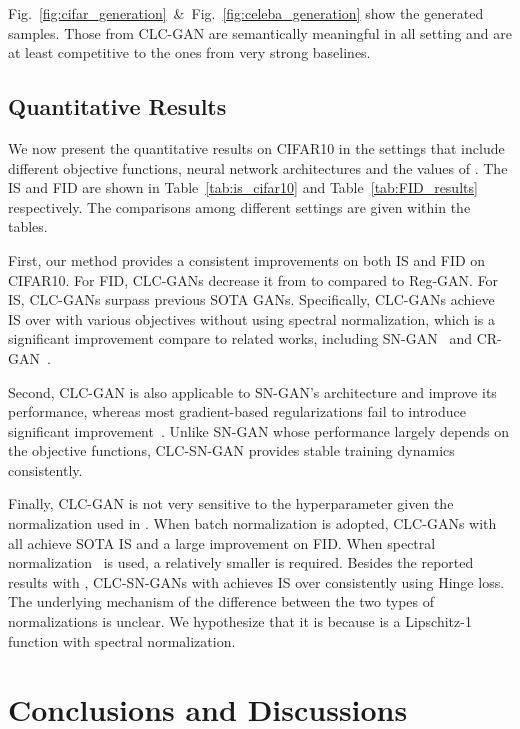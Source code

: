 \documentclass{article}
\newcommand{\fig}[1]{Fig.~\ref{fig:#1}}
\newcommand{\tabl}[1]{Table~\ref{tab:#1}}
\theoremstyle{definition}
\begin{document}
\fig{cifar_generation}~\&~\fig {celeba_generation} show the generated samples. Those from CLC-GAN are semantically meaningful in all setting and are at least competitive to the ones from very strong baselines.






\subsection{Quantitative Results}
\label{sec:quantative_results}

We now present the quantitative results on CIFAR10 in the settings that include different objective functions, neural network architectures and the values of . The IS and FID are shown in \tabl{is_cifar10} and \tabl{FID_results} respectively. The comparisons among different settings are given within the tables.



First, our method provides a consistent improvements on both IS and FID on CIFAR10. For FID, CLC-GANs decrease it from  to  compared to Reg-GAN. 
For IS, CLC-GANs surpass previous SOTA GANs. Specifically, CLC-GANs achieve IS over  with various objectives without using spectral normalization, which is a significant improvement compare to related works, including SN-GAN~\cite{miyato2018spectral} and CR-GAN~\cite{zhang2019consistency}. 

Second, CLC-GAN is also applicable to SN-GAN's architecture and improve its performance, whereas most gradient-based regularizations fail to introduce significant improvement~\cite{kurach2018large}.
Unlike SN-GAN whose performance largely depends on the objective functions, CLC-SN-GAN provides stable training dynamics consistently. 

Finally, CLC-GAN is not very sensitive to the hyperparameter  given the normalization used in . When batch normalization is adopted, CLC-GANs with  all achieve SOTA IS and a large improvement on FID. When spectral normalization~\cite{miyato2018spectral} is used, a relatively smaller  is required. 
Besides the reported results with , CLC-SN-GANs with  achieves IS over  consistently using Hinge loss.
The underlying mechanism of the difference between the two types of normalizations is unclear. We hypothesize that it is because  is a Lipschitz-1 function with spectral normalization.
	


\section{Conclusions and Discussions}
\end{document}
